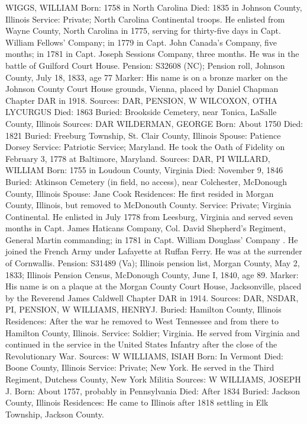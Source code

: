 WIGGS, WILLIAM 
Born: 1758 in North Carolina
Died: 1835 in Johnson County, Illinois 
Service: Private; North Carolina Continental troops. He enlisted from Wayne County, North Carolina in 1775, serving for thirty-five days in Capt. William Fellows' Company; in 1779 in Capt. John Canada's Company, five months; in 1781 in Capt. Joseph Sessions Company, three months. He was in the battle of Guilford Court House. 
Pension: S32608 (NC); Pension roll, Johnson County, July 18, 1833, age 77
Marker:  His name is on a bronze marker on the Johnson County Court House grounds, Vienna, placed by Daniel Chapman Chapter DAR in 1918. 
Sources: DAR, PENSION, W 
WILCOXON, OTHA LYCURGUS
Died: 1863 
Buried: Brookside Cemetery, near Tonica, LaSalle County, Illinois 
Sources: DAR 
WILDERMAN, GEORGE 
Born: About 1750
Died: 1821 
Buried: Freeburg Township, St. Clair County, Illinois 
Spouse:  Patience Dorsey
Service: Patriotic Service; Maryland. He took the Oath of Fidelity on February 3, 1778 at Baltimore, Maryland. 
Sources: DAR, PI 
WILLARD, WILLIAM 
Born: 1755 in Loudoun County, Virginia
Died: November 9, 1846 
Buried: Atkinson Cemetery (in field, no access), near Colchester, McDonough County, Illinois Spouse: Jane Cook Residences: He first resided in Morgan County, Illinois, but removed to McDon­outh County.
Service: Private; Virginia Continental. He enlisted in July 1778 from Leesburg, Virginia and served seven months in Capt. James Haticans Company, Col. David Shepherd's Regiment, General Martin commanding; in 1781 in Capt. William Douglass' Company . He joined the French Army under Lafayette at Ruffan Ferry. He was at the surrender of Cornwallis. 
Pension: S31489 (Va); Illinois pension list, Morgan County, May 2, 1833; Illinois Pension Census, McDonough County, June I, 1840, age 89.
Marker: His name is on a plaque at the Morgan County Court House, Jackson­ville, placed by the Reverend James Caldwell Chapter DAR in 1914. 
Sources: DAR, NSDAR, PI, PENSION, W 
WILLIAMS, HENRYJ. 
Buried: Hamilton County, Illinois 
Residences: After the war he removed to West Tennessee and from there to Hamilton County, Illinois. 
Service: Soldier; Virginia. He served from Virginia and continued in the service in the United States Infantry after the close of the Revolutionary War. 
Sources: W 
WILLIAMS, ISIAH 
Born: In Vermont
Died: Boone County, Illinois 
Service: Private; New York. He served in the Third Regiment, Dutchess County, New York Militia 
Sources: W 
WILLIAMS, JOSEPH J. 
Born: About 1757, probably in Pennsylvania
Died: After 1834 
Buried: Jackson County, Illinois Residences: He came to Illinois after 1818 settling in Elk Township, Jackson County.
